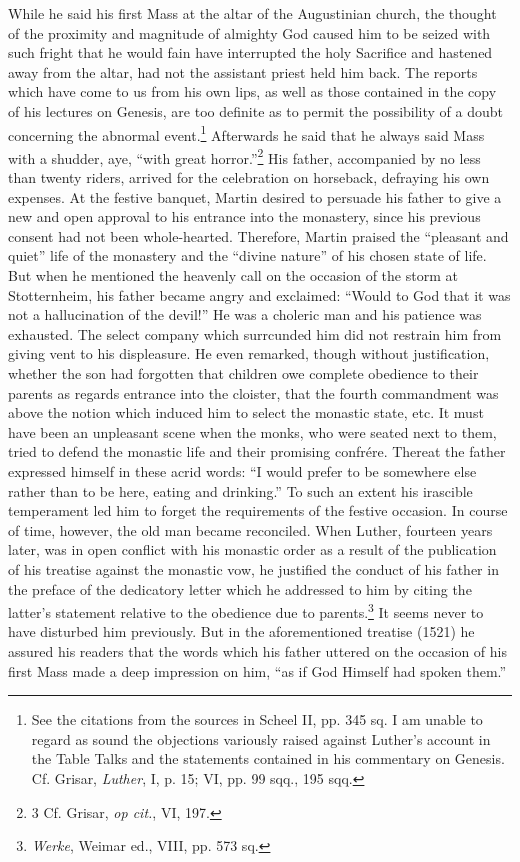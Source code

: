 While he said his first Mass at the altar of the Augustinian church,
the thought of the proximity and magnitude of almighty God caused
him to be seized with such fright that he would fain have interrupted
the holy Sacrifice and hastened away from the altar, had not
the assistant priest held him back. The reports which have come to
us from his own lips, as well as those contained in the copy of his
lectures on Genesis, are too definite as to permit the possibility of a
doubt concerning the abnormal event.\footnote{
See the citations from the sources in Scheel II, pp. 345 sq. I am unable to regard as
sound the objections variously raised against Luther’s account in the Table Talks and the
statements contained in his commentary on Genesis. Cf. Grisar, \textit{Luther}, I, p. 15; VI, pp.
99 sqq., 195 sqq.
}
Afterwards he said that he
always said Mass with a shudder, aye, “with great horror.”\footnote{3 Cf. Grisar, \textit{op cit.}, VI, 197.}
His father, accompanied by no less than twenty riders, arrived for
the celebration on horseback, defraying his own expenses. At the
festive banquet, Martin desired to persuade his father to give a
new and open approval to his entrance into the monastery, since
his previous consent had not been whole-hearted. Therefore, Martin
praised the “pleasant and quiet” life of the monastery and the “divine
nature” of his chosen state of life. But when he mentioned the heavenly
call on the occasion of the storm at Stotternheim, his father
became angry and exclaimed: “Would to God that it was not a
hallucination of the devil!” He was a choleric man and his patience
was exhausted. The select company which surrcunded him did not
restrain him from giving vent to his displeasure. He even remarked,
though without justification, whether the son had forgotten that
children owe complete obedience to their parents as regards entrance
into the cloister, that the fourth commandment was above the notion
which induced him to select the monastic state, etc. It must have
been an unpleasant scene when the monks, who were seated next to
them, tried to defend the monastic life and their promising confrére.
Thereat the father expressed himself in these acrid words: “I
would prefer to be somewhere else rather than to be here, eating
and drinking.” To such an extent his irascible temperament led him
to forget the requirements of the festive occasion. In course of time,
however, the old man became reconciled. When Luther, fourteen
years later, was in open conflict with his monastic order as a result
of the publication of his treatise against the monastic vow, he justified
the conduct of his father in the preface of the dedicatory letter
which he addressed to him by citing the latter’s statement relative
to the obedience due to parents.\footnote{\textit{Werke}, Weimar ed., VIII, pp. 573 sq.}
It seems never to have disturbed
him previously. But in the aforementioned treatise (1521) he
assured his readers that the words which his father uttered on the
occasion of his first Mass made a deep impression on him, “as if God
Himself had spoken them.”
